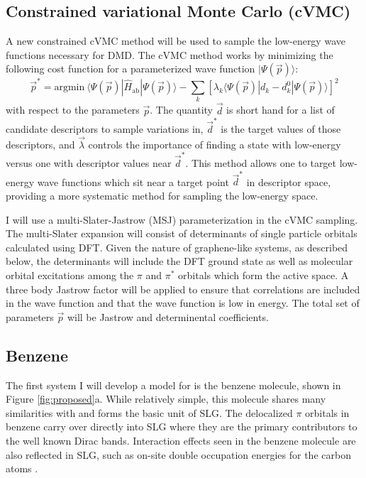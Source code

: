 \documentclass[12pt]{article}
\begin{document}
\subsection{Constrained variational Monte Carlo (cVMC)}
A new constrained cVMC method will be used to sample the low-energy wave functions necessary for DMD.
The cVMC method works by minimizing the following cost function for a parameterized wave function $|\Psi(\vec{p})\rangle$:
\begin{equation}
\vec{p}^* = \text{argmin} \ \langle \Psi(\vec{p}) | \hat{H}_\text{ab} | \Psi(\vec{p}) \rangle - \sum_k [\lambda_k \langle \Psi(\vec{p}) | d_k - d_{k}^0 | \Psi(\vec{p}) \rangle]^2
\end{equation}
with respect to the parameters $\vec{p}$.
The quantity $\vec{d}$ is short hand for a list of candidate descriptors to sample variations in, $\vec{d}^*$ is the target values of those descriptors, and $\vec{\lambda}$ controls the importance of finding a state with low-energy versus one with descriptor values near $\vec{d}^*$.
This method allows one to target low-energy wave functions which sit near a target point $\vec{d}^*$ in descriptor space, providing a more systematic method for sampling the low-energy space.

I will use a multi-Slater-Jastrow (MSJ) parameterization in the cVMC sampling.
The multi-Slater expansion will consist of determinants of single particle orbitals calculated using DFT.
Given the nature of graphene-like systems, as described below, the determinants will include the DFT ground state as well as molecular orbital excitations among the $\pi$ and $\pi^*$ orbitals which form the active space.
A three body Jastrow factor will be applied to ensure that correlations are included in the wave function and that the wave function is low in energy.
The total set of parameters $\vec{p}$ will be Jastrow and determinental coefficients.

\subsection{Benzene}
The first system I will develop a model for is the benzene molecule, shown in Figure \ref{fig:proposed}a.
While relatively simple, this molecule shares many similarities with and forms the basic unit of SLG.
The delocalized $\pi$ orbitals in benzene carry over directly into SLG where they are the primary contributors to the well known Dirac bands.
Interaction effects seen in the benzene molecule are also reflected in SLG, such as on-site double occupation energies for the carbon atoms \cite{Zheng2017, Wagner2015}.
\end{document}
